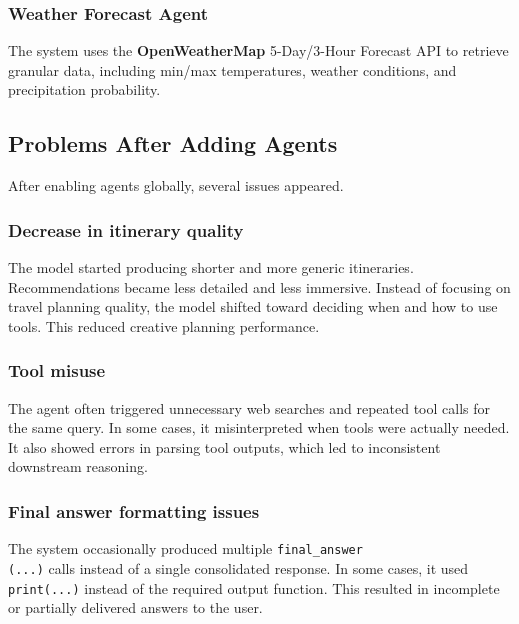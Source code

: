 \documentclass[fleqn,moreauthors,10pt]{ds_report}
\begin{document}

\subsubsection*{Weather Forecast Agent}
The system uses the \textbf{OpenWeatherMap} 5-Day/3-Hour Forecast API \cite{openweathermap-forecast5} to retrieve granular data, including min/max temperatures, weather conditions, and precipitation probability. %

\subsection*{Problems After Adding Agents}
After enabling agents globally, several issues appeared.
\subsubsection*{Decrease in itinerary quality}
The model started producing shorter and more generic itineraries. Recommendations became less detailed and less immersive. Instead of focusing on travel planning quality, the model shifted toward deciding when and how to use tools. This reduced creative planning performance.
\subsubsection*{Tool misuse}
The agent often triggered unnecessary web searches and repeated tool calls for the same query. In some cases, it misinterpreted when tools were actually needed. It also showed errors in parsing tool outputs, which led to inconsistent downstream reasoning.
\subsubsection*{Final answer formatting issues}
The system occasionally produced multiple \texttt{final\_answer\\(...)} calls instead of a single consolidated response. In some cases, it used \texttt{print(...)} instead of the required output function. This resulted in incomplete or partially delivered answers to the user.
\end{document}

